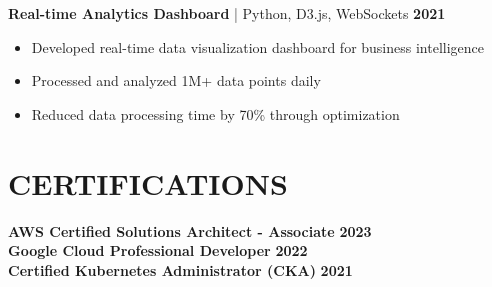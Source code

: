 \documentclass{article}
\begin{document}
\vspace{0.1cm}

\textbf{Real-time Analytics Dashboard} | Python, D3.js, WebSockets \hfill \textbf{2021}
\begin{itemize}[leftmargin=*, itemsep=0pt]
    \item Developed real-time data visualization dashboard for business intelligence
    \item Processed and analyzed 1M+ data points daily
    \item Reduced data processing time by 70\% through optimization
\end{itemize}

\vspace{0.2cm}

\section*{CERTIFICATIONS}
\textbf{AWS Certified Solutions Architect - Associate} \hfill \textbf{2023} \\
\textbf{Google Cloud Professional Developer} \hfill \textbf{2022} \\
\textbf{Certified Kubernetes Administrator (CKA)} \hfill \textbf{2021}
\end{document}
